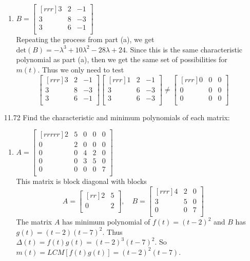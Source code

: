 \documentclass[12pt]{article}
\theoremstyle{definition}
\theoremstyle{plain}
\begin{document}
\begin{enumerate}
\begin{enumerate}
	\item $B=\begin{bmatrix}[rrr]3&2&-1\\3&8&-3\\3&6&-1\\\end{bmatrix}$\\
	Repeating the process from part (a), we get $\mathrm{det}(B)=-\lambda^3+10\lambda^2-28\lambda+24$. Since this is the same characteristic polynomial as part (a), then we get the same set of possibilities for $m(t)$. Thus we only need to test
	\[ \begin{bmatrix}[rrr]3&2&-1\\3&8&-3\\3&6&-1\\\end{bmatrix}\begin{bmatrix}[rrr]1&2&-1\\3&6&-3\\3&6&-3\\\end{bmatrix}\neq\begin{bmatrix}[rrr]0&0&0\\0&0&0\\0&0&0\\\end{bmatrix} \]
	\end{enumerate}
\item[11.72]Find the characteristic and minimum polynomials of each matrix:
	\begin{enumerate}
	\item $A=\begin{bmatrix}[rrrrr]2&5&0&0&0\\0&2&0&0&0\\0&0&4&2&0\\0&0&3&5&0\\0&0&0&0&7\\\end{bmatrix}$\\
	This matrix is block diagonal with blocks
	\[ A=\begin{bmatrix}[rr]2&5\\0&2\\\end{bmatrix}, \quad B=\begin{bmatrix}[rrr]4&2&0\\3&5&0\\0&0&7\\\end{bmatrix} \]
	The matrix $A$ has minimum polynomial of $f(t)=(t-2)^2$ and $B$ has $g(t)=(t-2)(t-7)^2$. Thus $\Delta(t) = f(t)g(t) = (t-2)^3(t-7)^2$. So $m(t)=LCM[f(t)g(t)] = (t-2)^2(t-7)$.

\end{enumerate}
\end{enumerate}
\end{document}
